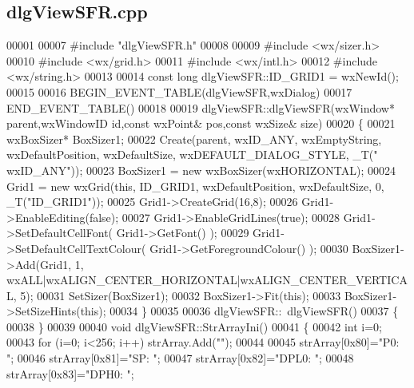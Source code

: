 \subsection{dlg\+View\+S\+F\+R.\+cpp}
\label{dlgViewSFR_8cpp_source}

\begin{DoxyCode}
00001 
00007 \textcolor{preprocessor}{#include "dlgViewSFR.h"}
00008 
00009 \textcolor{preprocessor}{#include <wx/sizer.h>}
00010 \textcolor{preprocessor}{#include <wx/grid.h>}
00011 \textcolor{preprocessor}{#include <wx/intl.h>}
00012 \textcolor{preprocessor}{#include <wx/string.h>}
00013 
00014 \textcolor{keyword}{const} \textcolor{keywordtype}{long} dlgViewSFR::ID_GRID1 = wxNewId();
00015 
00016 BEGIN\_EVENT\_TABLE(dlgViewSFR,wxDialog)
00017 END\_EVENT\_TABLE()
00018 
00019 dlgViewSFR::dlgViewSFR(wxWindow* parent,wxWindowID \textcolor{keywordtype}{id},const wxPoint& pos,const wxSize& 
      size)
00020 \{
00021     wxBoxSizer* BoxSizer1;
00022     Create(parent, wxID\_ANY, wxEmptyString, wxDefaultPosition, wxDefaultSize, wxDEFAULT\_DIALOG\_STYLE, \_T(\textcolor{stringliteral}{"
      wxID\_ANY"}));
00023     BoxSizer1 = \textcolor{keyword}{new} wxBoxSizer(wxHORIZONTAL);
00024     Grid1 = \textcolor{keyword}{new} wxGrid(\textcolor{keyword}{this}, ID\_GRID1, wxDefaultPosition, wxDefaultSize, 0, \_T(\textcolor{stringliteral}{"ID\_GRID1"}));
00025     Grid1->CreateGrid(16,8);
00026     Grid1->EnableEditing(\textcolor{keyword}{false});
00027     Grid1->EnableGridLines(\textcolor{keyword}{true});
00028     Grid1->SetDefaultCellFont( Grid1->GetFont() );
00029     Grid1->SetDefaultCellTextColour( Grid1->GetForegroundColour() );
00030     BoxSizer1->Add(Grid1, 1, wxALL|wxALIGN\_CENTER\_HORIZONTAL|wxALIGN\_CENTER\_VERTICAL, 5);
00031     SetSizer(BoxSizer1);
00032     BoxSizer1->Fit(\textcolor{keyword}{this});
00033     BoxSizer1->SetSizeHints(\textcolor{keyword}{this});
00034 \}
00035 
00036 dlgViewSFR::~dlgViewSFR()
00037 \{   
00038 \}
00039 
00040 \textcolor{keywordtype}{void} dlgViewSFR::StrArrayIni() 
00041 \{
00042     \textcolor{keywordtype}{int} i=0;
00043     \textcolor{keywordflow}{for} (i=0; i<256; i++) strArray.Add(\textcolor{stringliteral}{""});
00044 
00045     strArray[0x80]=\textcolor{stringliteral}{"P0: "};
00046     strArray[0x81]=\textcolor{stringliteral}{"SP: "};
00047     strArray[0x82]=\textcolor{stringliteral}{"DPL0: "};
00048     strArray[0x83]=\textcolor{stringliteral}{"DPH0: "};

\end{DoxyCode}
